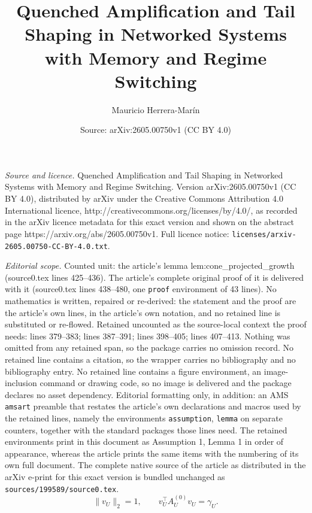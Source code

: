 \documentclass[10pt,a4paper]{amsart}
\title{Quenched Amplification and Tail Shaping in Networked Systems with Memory and Regime Switching}
\author{Mauricio Herrera-Mar\'in}
\date{Source: arXiv:2605.00750v1 (CC BY 4.0)}
\begin{document}
\maketitle

\noindent\emph{Source and licence.} Quenched Amplification and Tail Shaping in Networked Systems with Memory and Regime Switching. Version arXiv:2605.00750v1 (CC BY 4.0), distributed by arXiv under the Creative Commons Attribution 4.0 International licence, http://creativecommons.org/licenses/by/4.0/, as recorded in the arXiv licence metadata for this exact version and shown on the abstract page https://arxiv.org/abs/2605.00750v1. Full licence notice: \texttt{licenses/arxiv-2605.00750-CC-BY-4.0.txt}.\par\smallskip

\noindent\textit{Editorial scope.} Counted unit: the article's lemma lem:cone\_projected\_growth (source0.tex lines 425--436). The article's complete original proof of it is delivered with it (source0.tex lines 438--480, one \texttt{proof} environment of 43 lines). No mathematics is written, repaired or re-derived: the statement and the proof are the article's own lines, in the article's own notation, and no retained line is substituted or re-flowed.  Retained uncounted as the source-local context the proof needs: lines 379--383; lines 387--391; lines 398--405; lines 407--413.  Nothing was omitted from any retained span, so the package carries no omission record.  No retained line contains a citation, so the wrapper carries no bibliography and no bibliography entry.  No retained line contains a figure environment, an image-inclusion command or drawing code, so no image is delivered and the package declares no asset dependency.  Editorial formatting only, in addition: an AMS \texttt{amsart} preamble that restates the article's own declarations and macros used by the retained lines, namely the environments \texttt{assumption}, \texttt{lemma} on separate counters, together with the standard packages those lines need.  The retained environments print in this document as Assumption 1, Lemma 1 in order of appearance, whereas the article prints the same items with the numbering of its own full document.  The complete native source of the article as distributed in the arXiv e-print for this exact version is bundled unchanged as \texttt{sources/199589/source0.tex}.
\begin{equation}\label{eq:vU_top_def}
	\|v_U\|_2=1,
	\qquad
	v_U^\top A_U^{(0)} v_U=\gamma_U.
\end{equation}
\end{document}
